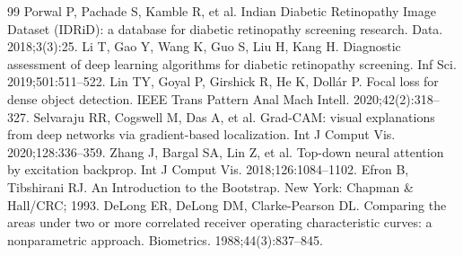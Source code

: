 \begin{thebibliography}{99}
 Porwal P, Pachade S, Kamble R, et al. Indian Diabetic Retinopathy Image Dataset (IDRiD): a database for diabetic retinopathy screening research. Data. 2018;3(3):25.
 Li T, Gao Y, Wang K, Guo S, Liu H, Kang H. Diagnostic assessment of deep learning algorithms for diabetic retinopathy screening. Inf Sci. 2019;501:511--522.
 Lin TY, Goyal P, Girshick R, He K, Doll\'ar P. Focal loss for dense object detection. IEEE Trans Pattern Anal Mach Intell. 2020;42(2):318--327.
 Selvaraju RR, Cogswell M, Das A, et al. Grad-CAM: visual explanations from deep networks via gradient-based localization. Int J Comput Vis. 2020;128:336--359.
 Zhang J, Bargal SA, Lin Z, et al. Top-down neural attention by excitation backprop. Int J Comput Vis. 2018;126:1084--1102.
 Efron B, Tibshirani RJ. An Introduction to the Bootstrap. New York: Chapman \& Hall/CRC; 1993.
 DeLong ER, DeLong DM, Clarke-Pearson DL. Comparing the areas under two or more correlated receiver operating characteristic curves: a nonparametric approach. Biometrics. 1988;44(3):837--845.
\end{thebibliography}

